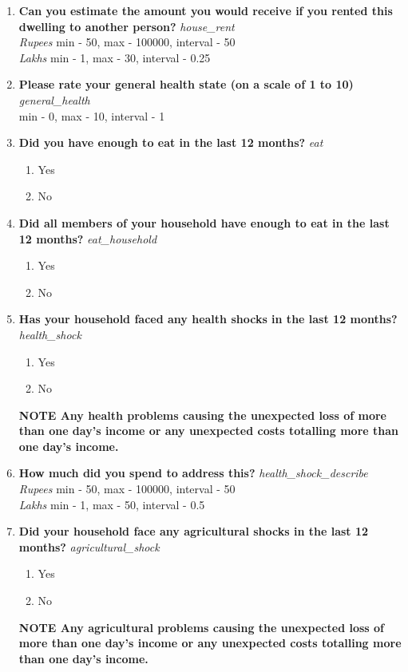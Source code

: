 \documentclass{article}
\begin{document}
\begin{enumerate}
\item {\bfseries Can you estimate the amount you would receive if you rented this dwelling to another person?}\emph{ house\_rent } 
\\ \emph{ Rupees }min - 50, max - 100000, interval - 50 
\\ \emph{ Lakhs }min - 1, max - 30, interval - 0.25 
 
\item {\bfseries Please rate your general health state (on a scale of 1 to 10)}\emph{ general\_health } 
\\min - 0, max - 10, interval - 1 
 
\item {\bfseries Did you have enough to eat in the last 12 months?}\emph{ eat } 
\begin{enumerate} 
\item Yes 
\item No 
\end{enumerate} 
\item {\bfseries Did all members of your household have enough to eat in the last 12 months?}\emph{ eat\_household } 
\begin{enumerate} 
\item Yes 
\item No 
\end{enumerate} 
\item {\bfseries Has your household faced any health shocks in the last 12 months?}\emph{ health\_shock } 
\begin{enumerate} 
\item Yes 
\item No 
\end{enumerate}\textbf{{\footnotesize NOTE} Any health problems causing the unexpected loss of more than one day's income or any unexpected costs totalling more than one day's income. } 
 
\item {\bfseries How much did you spend to address this?}\emph{ health\_shock\_describe } 
\\ \emph{ Rupees }min - 50, max - 100000, interval - 50 
\\ \emph{ Lakhs }min - 1, max - 50, interval - 0.5 
 
\item {\bfseries Did your household face any agricultural shocks in the last 12 months?}\emph{ agricultural\_shock } 
\begin{enumerate} 
\item Yes 
\item No 
\end{enumerate}\textbf{{\footnotesize NOTE} Any agricultural problems causing the unexpected loss of more than one day's income or any unexpected costs totalling more than one day's income. } 
 

\end{enumerate}
\end{document}
